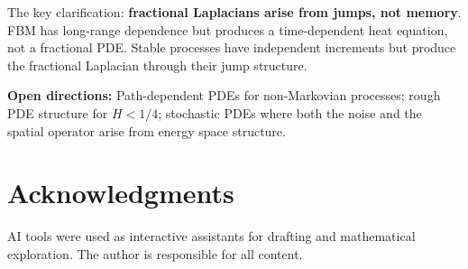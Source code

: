 \documentclass[11pt]{article}
\theoremstyle{definition}
\begin{document}
The key clarification: \textbf{fractional Laplacians arise from jumps, not memory}. FBM has long-range dependence but produces a time-dependent heat equation, not a fractional PDE. Stable processes have independent increments but produce the fractional Laplacian through their jump structure.

\textbf{Open directions:} Path-dependent PDEs for non-Markovian processes; rough PDE structure for $H < 1/4$; stochastic PDEs where both the noise and the spatial operator arise from energy space structure.

\section*{Acknowledgments}

AI tools were used as interactive assistants for drafting and mathematical exploration. The author is responsible for all content.
\end{document}
